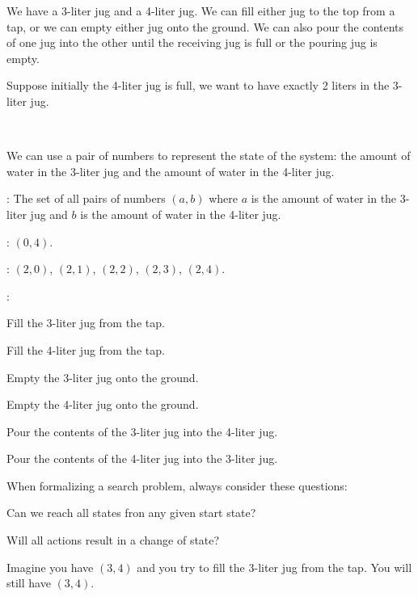 \begin{example}
    We have a 3-liter jug and a 4-liter jug. We can fill either jug to the top from a tap, or we can empty either jug onto the ground. We can also pour the contents of one jug into the other until the receiving jug is full or the pouring jug is empty.

    Suppose initially the 4-liter jug is full, we want to have exactly 2 liters in the 3-liter jug.

    {~~~}

    We can use a pair of numbers to represent the state of the system: the amount of water in the 3-liter jug and the amount of water in the 4-liter jug.

    \begin{listu}
        \item {}: The set of all pairs of numbers $(a, b)$ where $a$ is the amount of water in the 3-liter jug and $b$ is the amount of water in the 4-liter jug.
        \item {}: $(0, 4)$.
        \item {}: $(2, 0)$, $(2, 1)$, $(2, 2)$, $(2, 3)$, $(2, 4)$.
        \item {}: 
        \begin{listu}
            \item Fill the 3-liter jug from the tap.
            \item Fill the 4-liter jug from the tap.
            \item Empty the 3-liter jug onto the ground.
            \item Empty the 4-liter jug onto the ground.
            \item Pour the contents of the 3-liter jug into the 4-liter jug.
            \item Pour the contents of the 4-liter jug into the 3-liter jug.
        \end{listu}
    \end{listu}

    \begin{remark}
        When formalizing a search problem, always consider these questions:

        \begin{listo}
            \item Can we reach all states fron any given start state?

            \item Will all actions result in a change of state? 

             Imagine you have $(3, 4)$ and you try to fill the 3-liter jug from the tap. You will still have $(3, 4)$.
        \end{listo}
    \end{remark}
\end{example}

